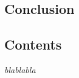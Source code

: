   \begin{titlepage}
    \vspace*{\fill}
      \part{Conclusion}
    \vspace*{\fill}
  \end{titlepage}

\startcontents[parts]
  
\chapter*{Contents}

\textit{blablabla}

\vspace{\baselineskip}


\pagebreak


\newpage


\stopcontents[parts]